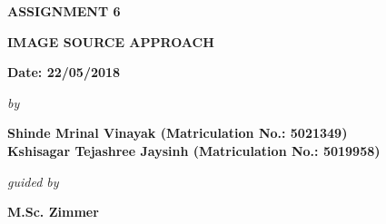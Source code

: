 \begin{center}
\vspace{-2.2cm}
\vspace{2.5cm}
\bfseries{ASSIGNMENT 6}\\
\vspace{0.5cm}
\begin{large}
{\bfseries IMAGE SOURCE APPROACH }\\
\end{large}
\vspace{0.5cm}
{\bfseries Date: 22/05/2018 }\\
\vspace{0.4cm}
\begin{small}
\emph{by}\\
\end{small}
\vspace{0.4cm}
\bfseries{Shinde Mrinal Vinayak (Matriculation No.: 5021349)\\Kshisagar Tejashree Jaysinh (Matriculation No.: 5019958)}\\
\vspace{0.3cm}
\begin{small}
\emph{guided by}\\
\end{small}
\vspace{0.3cm}
{\bfseries \large M.Sc. Zimmer}\\
\vspace{0.1cm}
\end{center}

